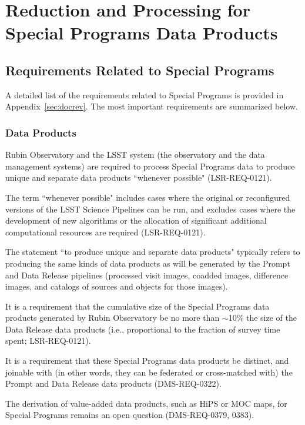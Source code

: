 \documentclass[DM,lsstdoc,toc]{lsstdoc}
\begin{document}
\clearpage
\section{Reduction and Processing for Special Programs Data Products}\label{sec:proc}


\subsection{Requirements Related to Special Programs}\label{ssec:proc_reqs}

A detailed list of the requirements related to Special Programs is provided in Appendix~\ref{sec:docrev}.
The most important requirements are summarized below.

\subsubsection{Data Products}

Rubin Observatory and the LSST system (the observatory and the data management systems) are required to process Special Programs data to produce unique and separate data products ``whenever possible" (LSR-REQ-0121).

The term ``whenever possible" includes cases where the original or reconfigured versions of the LSST Science Pipelines can be run, and excludes cases where the development of new algorithms or the allocation of significant additional computational resources are required (LSR-REQ-0121).

The statement ``to produce unique and separate data products" typically refers to producing the same kinds of data products as will be generated by the Prompt and Data Release pipelines (processed visit images, coadded images, difference images, and catalogs of sources and objects for those images).

It is a requirement that the cumulative size of the Special Programs data products generated by Rubin Observatory be no more than $\sim$10\% the size of the Data Release data products (i.e., proportional to the fraction of survey time spent; LSR-REQ-0121).

It is a requirement that these Special Programs data products be distinct, and joinable with (in other words, they can be federated or cross-matched with) the Prompt and Data Release data products (DMS-REQ-0322).

The derivation of value-added data products, such as HiPS or MOC maps, for Special Programs remains an open question (DMS-REQ-0379, 0383).
\end{document}
